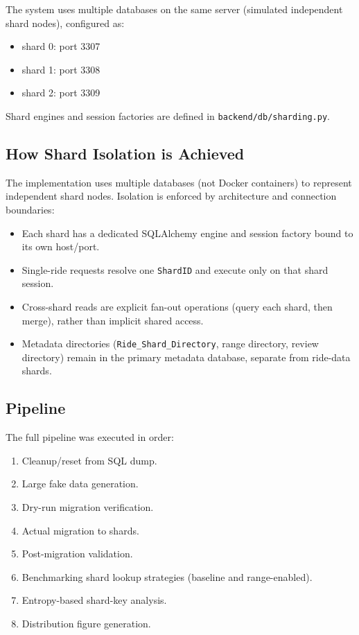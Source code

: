 \documentclass[12pt]{article}
\begin{document}
The system uses multiple databases on the same server (simulated independent shard nodes), configured as:
\begin{itemize}
    \item shard 0: port 3307
    \item shard 1: port 3308
    \item shard 2: port 3309
\end{itemize}

Shard engines and session factories are defined in \texttt{backend/db/sharding.py}.

\subsection{How Shard Isolation is Achieved}

The implementation uses multiple databases (not Docker containers) to represent independent shard nodes.
Isolation is enforced by architecture and connection boundaries:
\begin{itemize}
    \item Each shard has a dedicated SQLAlchemy engine and session factory bound to its own host/port.
    \item Single-ride requests resolve one \texttt{ShardID} and execute only on that shard session.
    \item Cross-shard reads are explicit fan-out operations (query each shard, then merge), rather than implicit shared access.
    \item Metadata directories (\texttt{Ride\_Shard\_Directory}, range directory, review directory) remain in the primary metadata database, separate from ride-data shards.
\end{itemize}

\subsection{Pipeline}

The full pipeline was executed in order:
\begin{enumerate}
    \item Cleanup/reset from SQL dump.
    \item Large fake data generation.
    \item Dry-run migration verification.
    \item Actual migration to shards.
    \item Post-migration validation.
    \item Benchmarking shard lookup strategies (baseline and range-enabled).
    \item Entropy-based shard-key analysis.
    \item Distribution figure generation.
\end{enumerate}
\end{document}
